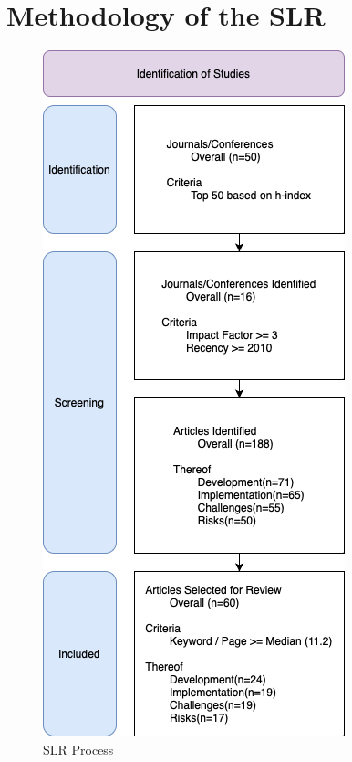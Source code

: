 \documentclass{article}
\begin{document}

\section{Methodology of the SLR}

\begin{figure}
    \centering
    \includegraphics[width=\textwidth,height=\textheight,keepaspectratio]{filtration.png}
    \caption{SLR Process}
\end{figure}
 
\end{document}
